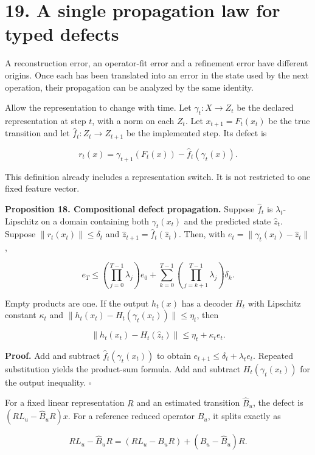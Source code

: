 \documentclass[11pt,letterpaper]{article}
\begin{document}
\section{19. A single propagation law for typed
defects}\label{a-single-propagation-law-for-typed-defects}

A reconstruction error, an operator-fit error and a refinement error
have different origins. Once each has been translated into an error in
the state used by the next operation, their propagation can be analyzed
by the same identity.

Allow the representation to change with time. Let \(\gamma_t:X\to Z_t\)
be the declared representation at step \(t\), with a norm on each
\(Z_t\). Let \(x_{t+1}=F_t(x_t)\) be the true transition and let
\(\widehat f_t:Z_t\to Z_{t+1}\) be the implemented step. Its defect is

\[
r_t(x)=\gamma_{t+1}(F_t(x))-\widehat f_t(\gamma_t(x)).
\]

This definition already includes a representation switch. It is not
restricted to one fixed feature vector.

\textbf{Proposition 18. Compositional defect propagation.} Suppose
\(\widehat f_t\) is \(\lambda_t\)-Lipschitz on a domain containing both
\(\gamma_t(x_t)\) and the predicted state \(\widehat z_t\). Suppose
\(\|r_t(x_t)\|\leq\delta_t\) and
\(\widehat z_{t+1}=\widehat f_t(\widehat z_t)\). Then, with
\(e_t=\|\gamma_t(x_t)-\widehat z_t\|\),

\[
\boxed{
e_T\leq
\left(\prod_{j=0}^{T-1}\lambda_j\right)e_0
+\sum_{k=0}^{T-1}
\left(\prod_{j=k+1}^{T-1}\lambda_j\right)\delta_k.
}
\]

Empty products are one. If the output \(h_t(x)\) has a decoder \(H_t\)
with Lipschitz constant \(\kappa_t\) and
\(\|h_t(x_t)-H_t(\gamma_t(x_t))\|\leq\eta_t\), then

\[
\|h_t(x_t)-H_t(\widehat z_t)\|
\leq\eta_t+\kappa_te_t.
\]

\textbf{Proof.} Add and subtract \(\widehat f_t(\gamma_t(x_t))\) to
obtain \(e_{t+1}\leq\delta_t+\lambda_te_t\). Repeated substitution
yields the product-sum formula. Add and subtract \(H_t(\gamma_t(x_t))\)
for the output inequality. \(\square\)

For a fixed linear representation \(R\) and an estimated transition
\(\widehat B_u\), the defect is \((RL_u-\widehat B_uR)x\). For a
reference reduced operator \(B_u\), it splits exactly as

\[
RL_u-\widehat B_uR
=(RL_u-B_uR)+(B_u-\widehat B_u)R.
\]
\end{document}
